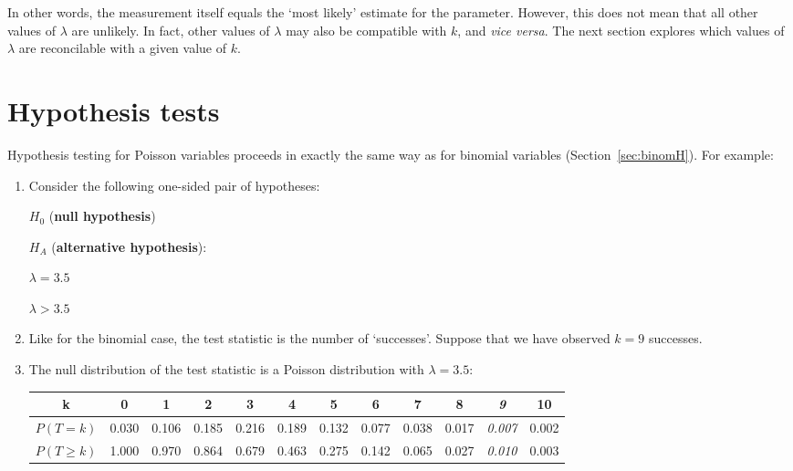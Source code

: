 In other words, the measurement itself equals the `most likely'
estimate for the parameter. However, this does not mean that all other
values of $\lambda$ are unlikely. In fact, other values of $\lambda$
may also be compatible with $k$, and \emph{vice versa}. The next
section explores which values of $\lambda$ are reconcilable with a
given value of $k$.

\section{Hypothesis tests}
\label{sec:poishyp}

Hypothesis testing for Poisson variables proceeds in exactly the same
way as for binomial variables (Section~\ref{sec:binomH}). For example:

\begin{enumerate}
\item Consider the following one-sided pair of hypotheses:

  \noindent\begin{minipage}{.4\textwidth}
    $H_0$ (\textbf{null hypothesis})
    
    \vspace{1em}
    
    $H_{\!A}$ (\textbf{alternative hypothesis}):
  \end{minipage}
  \begin{minipage}{.2\textwidth}
  \end{minipage}
  \begin{minipage}{.2\textwidth}
    $\lambda = 3.5$
    
    \vspace{1em}
    
    $\lambda>{3.5}$
  \end{minipage}
  \begin{minipage}{.2\textwidth}
  \end{minipage}\medskip

\item Like for the binomial case, the test statistic is the number of
  `successes'.  Suppose that we have observed $k=9$ successes.

\item The null distribution of the test statistic is a Poisson
  distribution with $\lambda={3.5}$:
  
  \begin{tabular}{c@{~}c@{~}c@{~}c@{~}c@{~}c@{~}c@{~}c@{~}c@{~}c@{~}c@{~}c}
    k & 0 & 1 & 2 & 3 & 4 & 5 & 6 & 7 & 8 & \textit{9} & 10 \\ \hline
    $P(T=k)$ & 0.030 & 0.106 & 0.185 & 0.216 & 0.189 &
    0.132 & 0.077 & 0.038 & 0.017 & \textit{0.007} & 0.002 \\
    $P({T}\geq{k})$ & 1.000 & 0.970 & 0.864 & 0.679 & 0.463 &
    0.275 & 0.142 & 0.065 & 0.027 & \textit{0.010} & 0.003 \\
  \end{tabular}


\end{enumerate}
